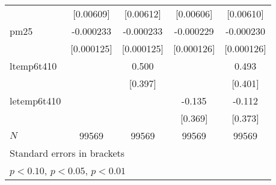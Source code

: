 {\begin{tabular}{l*{4}{c}}
            &   [0.00609]         &   [0.00612]         &   [0.00606]         &   [0.00610]         \\
[1em]
pm25        &   -0.000233\sym{*}  &   -0.000233\sym{*}  &   -0.000229\sym{*}  &   -0.000230\sym{*}  \\
            &  [0.000125]         &  [0.000125]         &  [0.000126]         &  [0.000126]         \\
[1em]
ltemp6t410  &                     &       0.500         &                     &       0.493         \\
            &                     &     [0.397]         &                     &     [0.401]         \\
[1em]
letemp6t410 &                     &                     &      -0.135         &      -0.112         \\
            &                     &                     &     [0.369]         &     [0.373]         \\
\hline
\(N\)       &       99569         &       99569         &       99569         &       99569         \\
\hline\hline
\multicolumn{5}{l}{\footnotesize Standard errors in brackets}\\
\multicolumn{5}{l}{\footnotesize \sym{*} \(p<0.10\), \sym{**} \(p<0.05\), \sym{***} \(p<0.01\)}\\
\end{tabular}
}
